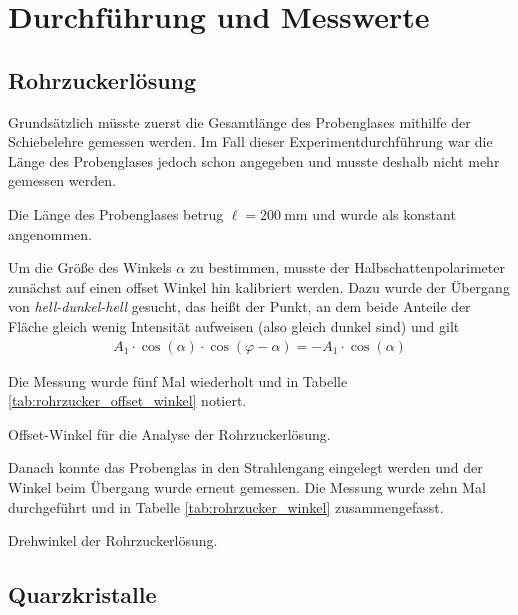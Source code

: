 \documentclass{article}
\begin{document}
\section{Durchführung und Messwerte}

\subsection{Rohrzuckerlösung}

Grundsätzlich müsste zuerst die Gesamtlänge des Probenglases mithilfe der Schiebelehre gemessen werden. Im Fall dieser Experimentdurchführung war die Länge des Probenglases jedoch schon angegeben und musste deshalb nicht mehr gemessen werden.

Die Länge des Probenglases betrug $\ell = 200~$mm und wurde als konstant angenommen.


Um die Größe des Winkels $\alpha$ zu bestimmen, musste der Halbschattenpolarimeter zunächst auf einen offset Winkel hin kalibriert werden. Dazu wurde der Übergang von \textit{hell-dunkel-hell} gesucht, das heißt der Punkt, an dem beide Anteile der Fläche gleich wenig Intensität aufweisen (also gleich dunkel sind) und gilt
\begin{align*}
A_1\cdot\cos(\alpha)\cdot\cos(\varphi-\alpha) = -A_1\cdot\cos(\alpha)
\end{align*}

Die Messung wurde fünf Mal wiederholt und in Tabelle \ref{tab:rohrzucker_offset_winkel} notiert.

\begin{table}[H]
\caption{Offset-Winkel für die Analyse der Rohrzuckerlösung.}
\label{tab:rohrzucker_offset_winkel}
\centering

\end{table}



Danach konnte das Probenglas in den Strahlengang eingelegt werden und der Winkel beim Übergang wurde erneut gemessen. Die Messung wurde zehn Mal durchgeführt und in Tabelle \ref{tab:rohrzucker_winkel} zusammengefasst.


\begin{table}[H]
\caption{Drehwinkel der Rohrzuckerlösung.}
\label{tab:rohrzucker_winkel}
\centering

\end{table}


\subsection{Quarzkristalle}
\end{document}
